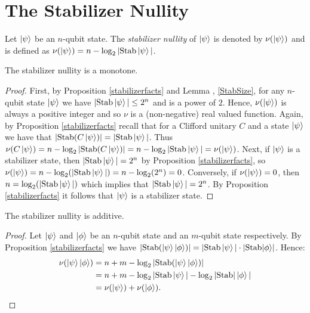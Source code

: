 \documentclass[12pt]{dalthesis}
\begin{document}
\section{The Stabilizer Nullity}

\begin{definition}
Let $\ket{\psi}$ be an  $n$-qubit state. The \emph{stabilizer nullity} of $\ket{\psi}$ is denoted by $\nu(\ket{\psi})$ and is defined as $\nu(\ket{\psi}) = n - \log_2 |\text{Stab}\ket{\psi}|$.
\end{definition}

\begin{proposition}
The stabilizer nullity is a monotone.
\end{proposition}
\begin{proof}
First, by Proposition \ref{stabilizerfacts} and Lemma , \ref{StabSize}, for any $n$-qubit state $\ket{\psi}$ we have $|\mathrm{Stab} \ket{\psi}| \leq 2^n$ and is a power of $2$. Hence, $\nu (\ket{\psi})$ is always a positive integer and so $\nu$ is a (non-negative) real valued function. Again, by Proposition \ref{stabilizerfacts} recall that for a Clifford unitary $C$ and a state $\ket{\psi}$ we have that $|\mathrm{Stab}(C\ket{\psi})| = |\mathrm{Stab}\ket{\psi}|$. Thus $\nu(C\ket{\psi}) = n - \log_2|\mathrm{Stab}(C\ket{\psi})| = n - \log_2|\mathrm{Stab}\ket{\psi}| = \nu(\ket{\psi})$. Next, if $\ket{\psi}$ is a stabilizer state, then $|\mathrm{Stab}\ket{\psi}| = 2^n$ by Proposition \ref{stabilizerfacts}, so $\nu(\ket{\psi}) = n - \log_2(|\mathrm{Stab}\ket{\psi}|) =  n - \log_2(2^n) = 0$. Conversely, if $\nu (\ket{\psi}) = 0$, then $n = \log_2(|\mathrm{Stab}\ket{\psi}|)$ which implies that $|\mathrm{Stab}\ket{\psi}| = 2^n$. By Proposition \ref{stabilizerfacts} it follows that $\ket{\psi}$ is a stabilizer state.
\end{proof}

\begin{proposition}
The stabilizer nullity is additive.
\end{proposition}
\begin{proof}
Let $\ket{\psi}$ and $\ket{\phi}$ be an $n$-qubit state and an $m$-qubit state respectively. By Proposition \ref{stabilizerfacts} we have $|\mathrm{Stab}(\ket{\psi} \ket{\phi})| = |\mathrm{Stab}\ket{\psi}| \cdot |\mathrm{Stab}{\ket{\phi}}|$. Hence:
\begin{equation*}
\begin{split}
\nu (\ket{\psi}\ket{\phi}) & = n + m - \log_2 |\mathrm{Stab} (\ket{\psi}\ket{\phi})| \\
& = n + m - \log_2 |\mathrm{Stab} \ket{\psi}| - \log_2|\mathrm{Stab}|\ket{\phi}| \\
& = \nu(\ket{\psi}) + \nu (\ket{\phi}).
\end{split}
\end{equation*}
\end{proof}
\end{document}
